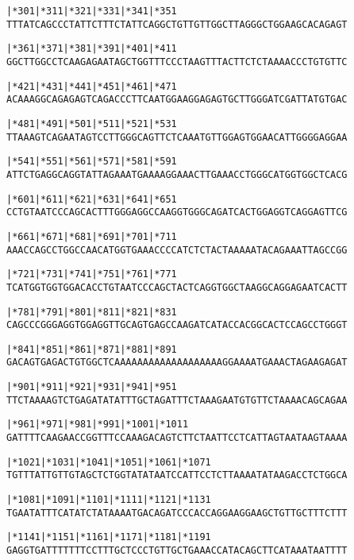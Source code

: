 \documentclass{article}
\begin{document}
\begin{alltt}
     |*301     |*311     |*321     |*331     |*341     |*351
TTTATCAGCCCTATTCTTTCTATTCAGGCTGTTGTTGGCTTAGGGCTGGAAGCACAGAGT

     |*361     |*371     |*381     |*391     |*401     |*411
GGCTTGGCCTCAAGAGAATAGCTGGTTTCCCTAAGTTTACTTCTCTAAAACCCTGTGTTC

     |*421     |*431     |*441     |*451     |*461     |*471
ACAAAGGCAGAGAGTCAGACCCTTCAATGGAAGGAGAGTGCTTGGGATCGATTATGTGAC

     |*481     |*491     |*501     |*511     |*521     |*531
TTAAAGTCAGAATAGTCCTTGGGCAGTTCTCAAATGTTGGAGTGGAACATTGGGGAGGAA

     |*541     |*551     |*561     |*571     |*581     |*591
ATTCTGAGGCAGGTATTAGAAATGAAAAGGAAACTTGAAACCTGGGCATGGTGGCTCACG

     |*601     |*611     |*621     |*631     |*641     |*651
CCTGTAATCCCAGCACTTTGGGAGGCCAAGGTGGGCAGATCACTGGAGGTCAGGAGTTCG

     |*661     |*671     |*681     |*691     |*701     |*711
AAACCAGCCTGGCCAACATGGTGAAACCCCATCTCTACTAAAAATACAGAAATTAGCCGG

     |*721     |*731     |*741     |*751     |*761     |*771
TCATGGTGGTGGACACCTGTAATCCCAGCTACTCAGGTGGCTAAGGCAGGAGAATCACTT

     |*781     |*791     |*801     |*811     |*821     |*831
CAGCCCGGGAGGTGGAGGTTGCAGTGAGCCAAGATCATACCACGGCACTCCAGCCTGGGT

     |*841     |*851     |*861     |*871     |*881     |*891
GACAGTGAGACTGTGGCTCAAAAAAAAAAAAAAAAAAAGGAAAATGAAACTAGAAGAGAT

     |*901     |*911     |*921     |*931     |*941     |*951
TTCTAAAAGTCTGAGATATATTTGCTAGATTTCTAAAGAATGTGTTCTAAAACAGCAGAA

     |*961     |*971     |*981     |*991     |*1001    |*1011
GATTTTCAAGAACCGGTTTCCAAAGACAGTCTTCTAATTCCTCATTAGTAATAAGTAAAA

     |*1021    |*1031    |*1041    |*1051    |*1061    |*1071
TGTTTATTGTTGTAGCTCTGGTATATAATCCATTCCTCTTAAAATATAAGACCTCTGGCA

     |*1081    |*1091    |*1101    |*1111    |*1121    |*1131
TGAATATTTCATATCTATAAAATGACAGATCCCACCAGGAAGGAAGCTGTTGCTTTCTTT

     |*1141    |*1151    |*1161    |*1171    |*1181    |*1191
GAGGTGATTTTTTTCCTTTGCTCCCTGTTGCTGAAACCATACAGCTTCATAAATAATTTT

\end{alltt}
\newpage
\end{document}
